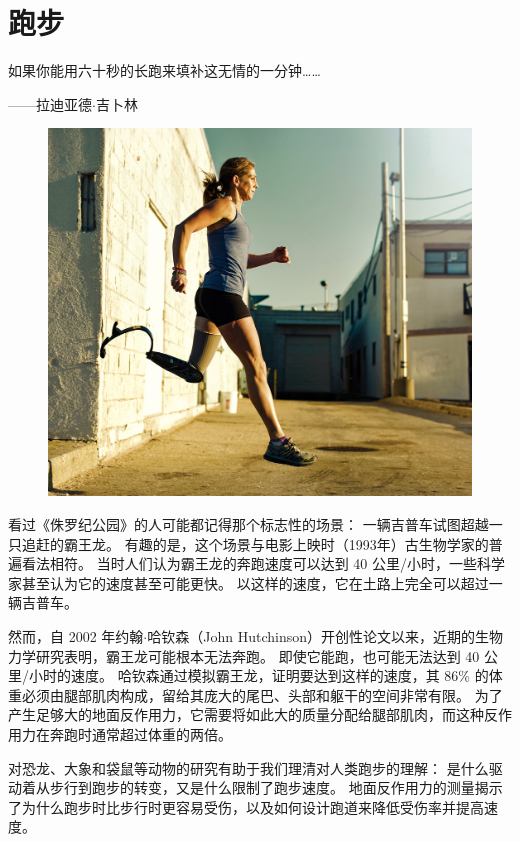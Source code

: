 \chapter{跑步} \label{chap:chap3}

如果你能用六十秒的长跑来填补这无情的一分钟……
\begin{flushright}
	——拉迪亚德$\cdot$吉卜林
\end{flushright}


\begin{figure}[!htb]
	\centering
	\includegraphics[width=1.0\linewidth]{chap3/3_0}
	\caption*{ \label{fig:3_0}}
\end{figure}

看过《侏罗纪公园》的人可能都记得那个标志性的场景：
一辆吉普车试图超越一只追赶的霸王龙。
有趣的是，这个场景与电影上映时（1993年）古生物学家的普遍看法相符。
当时人们认为霸王龙的奔跑速度可以达到 40 公里/小时，一些科学家甚至认为它的速度甚至可能更快。
以这样的速度，它在土路上完全可以超过一辆吉普车。


然而，自 2002 年约翰$\cdot$哈钦森（John Hutchinson）开创性论文以来，近期的生物力学研究表明，霸王龙可能根本无法奔跑。
即使它能跑，也可能无法达到 40 公里/小时的速度。
哈钦森通过模拟霸王龙，证明要达到这样的速度，其 86\% 的体重必须由腿部肌肉构成，留给其庞大的尾巴、头部和躯干的空间非常有限。
为了产生足够大的地面反作用力，它需要将如此大的质量分配给腿部肌肉，而这种反作用力在奔跑时通常超过体重的两倍。


对恐龙、大象和袋鼠等动物的研究有助于我们理清对人类跑步的理解：
是什么驱动着从步行到跑步的转变，又是什么限制了跑步速度。
地面反作用力的测量揭示了为什么跑步时比步行时更容易受伤，以及如何设计跑道来降低受伤率并提高速度。


